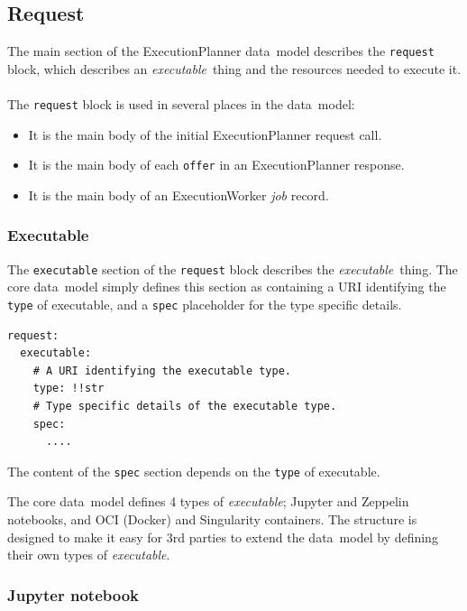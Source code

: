 \documentclass[11pt,a4paper]{ivoa}
\newcommand{\datamodel} {data~model}
\newcommand{\execplanner} {ExecutionPlanner}
\newcommand{\execworker} {ExecutionWorker}
\newcommand{\jupyter} {Jupyter}
\newcommand{\zeppelin} {Zeppelin}
\newcommand{\singularity} {Singularity}
\newcommand{\codeword}[1] {\texttt{#1}}
\newcommand{\executable} {\textit{executable}}
\newcommand{\executablething} {\textit{executable}~thing}
\newcommand{\job} {\textit{job}}
\begin{document}
\subsection{Request}
\label{datamodel-request}

The main section of the \execplanner{} \datamodel{} describes the \codeword{request} block,
which describes an \executablething{} and the resources needed to execute it.
\\
\\
The \codeword{request} block is used in several places in the \datamodel{}:
\begin{itemize}[]
    \item It is the main body of the initial \execplanner{} request call.
    \item It is the main body of each \codeword{offer} in an \execplanner{} response.
    \item It is the main body of an \execworker{} \job{} record.
\end{itemize}

\subsubsection{Executable}
\label{datamodel-executable}

The \codeword{executable} section of the \codeword{request} block describes the \executablething{}.
The core \datamodel{} simply defines this section as containing a URI identifying the \codeword{type} of executable,
and a \codeword{spec} placeholder for the type specific details.

\begin{lstlisting}[]
request:
  executable:
    # A URI identifying the executable type.
    type: !!str
    # Type specific details of the executable type.
    spec:
      ....
\end{lstlisting}

The content of the \codeword{spec} section depends on the \codeword{type} of executable.

The core \datamodel{} defines 4 types of \executable{};
\jupyter{} and \zeppelin{} notebooks, and OCI (Docker) and \singularity{} containers.
The structure is designed to make it easy for 3rd parties to extend the \datamodel{}
by defining their own types of \executable{}.

\subsubsection{Jupyter notebook}
\label{datamodel-jupyter-notebook}
\end{document}
